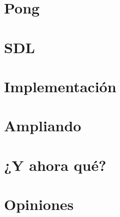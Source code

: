 \documentclass{beamer}
\begin{document}
\section{Pong}

\section{SDL}

\section{Implementación}

\section{Ampliando}

\section{¿Y ahora qué?}

\section{Opiniones}
\end{document}
